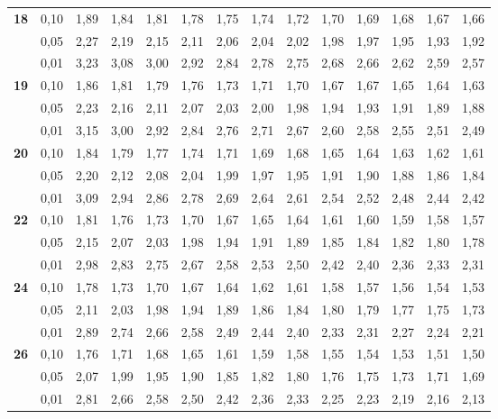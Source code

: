 \documentclass[12pt,a4paper]{article}
\begin{document}
{\begin{longtable}{@{\extracolsep{\fill}}rrrrrrrrrrrrrr@{}}
\addlinespace[1pt]
\textbf{18} & 0,10 & 1,89 & 1,84 & 1,81 & 1,78 & 1,75 & 1,74 & 1,72 & 1,70 & 1,69 & 1,68 & 1,67 & 1,66 \\*
 & 0,05 & 2,27 & 2,19 & 2,15 & 2,11 & 2,06 & 2,04 & 2,02 & 1,98 & 1,97 & 1,95 & 1,93 & 1,92 \\*
 & 0,01 & 3,23 & 3,08 & 3,00 & 2,92 & 2,84 & 2,78 & 2,75 & 2,68 & 2,66 & 2,62 & 2,59 & 2,57 \\
\addlinespace[1pt]
\textbf{19} & 0,10 & 1,86 & 1,81 & 1,79 & 1,76 & 1,73 & 1,71 & 1,70 & 1,67 & 1,67 & 1,65 & 1,64 & 1,63 \\*
 & 0,05 & 2,23 & 2,16 & 2,11 & 2,07 & 2,03 & 2,00 & 1,98 & 1,94 & 1,93 & 1,91 & 1,89 & 1,88 \\*
 & 0,01 & 3,15 & 3,00 & 2,92 & 2,84 & 2,76 & 2,71 & 2,67 & 2,60 & 2,58 & 2,55 & 2,51 & 2,49 \\
\addlinespace[1pt]
\textbf{20} & 0,10 & 1,84 & 1,79 & 1,77 & 1,74 & 1,71 & 1,69 & 1,68 & 1,65 & 1,64 & 1,63 & 1,62 & 1,61 \\*
 & 0,05 & 2,20 & 2,12 & 2,08 & 2,04 & 1,99 & 1,97 & 1,95 & 1,91 & 1,90 & 1,88 & 1,86 & 1,84 \\*
 & 0,01 & 3,09 & 2,94 & 2,86 & 2,78 & 2,69 & 2,64 & 2,61 & 2,54 & 2,52 & 2,48 & 2,44 & 2,42 \\
\addlinespace[1pt]
\textbf{22} & 0,10 & 1,81 & 1,76 & 1,73 & 1,70 & 1,67 & 1,65 & 1,64 & 1,61 & 1,60 & 1,59 & 1,58 & 1,57 \\*
 & 0,05 & 2,15 & 2,07 & 2,03 & 1,98 & 1,94 & 1,91 & 1,89 & 1,85 & 1,84 & 1,82 & 1,80 & 1,78 \\*
 & 0,01 & 2,98 & 2,83 & 2,75 & 2,67 & 2,58 & 2,53 & 2,50 & 2,42 & 2,40 & 2,36 & 2,33 & 2,31 \\
\addlinespace[1pt]
\textbf{24} & 0,10 & 1,78 & 1,73 & 1,70 & 1,67 & 1,64 & 1,62 & 1,61 & 1,58 & 1,57 & 1,56 & 1,54 & 1,53 \\*
 & 0,05 & 2,11 & 2,03 & 1,98 & 1,94 & 1,89 & 1,86 & 1,84 & 1,80 & 1,79 & 1,77 & 1,75 & 1,73 \\*
 & 0,01 & 2,89 & 2,74 & 2,66 & 2,58 & 2,49 & 2,44 & 2,40 & 2,33 & 2,31 & 2,27 & 2,24 & 2,21 \\
\addlinespace[1pt]
\textbf{26} & 0,10 & 1,76 & 1,71 & 1,68 & 1,65 & 1,61 & 1,59 & 1,58 & 1,55 & 1,54 & 1,53 & 1,51 & 1,50 \\*
 & 0,05 & 2,07 & 1,99 & 1,95 & 1,90 & 1,85 & 1,82 & 1,80 & 1,76 & 1,75 & 1,73 & 1,71 & 1,69 \\*
 & 0,01 & 2,81 & 2,66 & 2,58 & 2,50 & 2,42 & 2,36 & 2,33 & 2,25 & 2,23 & 2,19 & 2,16 & 2,13 \\

\end{longtable}}
\end{document}
